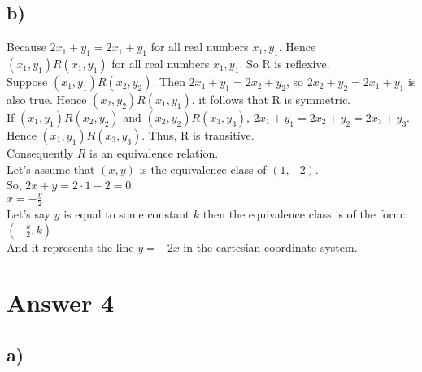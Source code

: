 \documentclass[12pt]{article}
\begin{document}
\subsection*{b) }
Because $2x_1 + y_1 = 2x_1 + y_1 $ for all real numbers $x_1,y_1$. Hence $(x_1,y_1)R(x_1,y_1)$  for all real numbers $x_1,y_1$. So R is reflexive.\\
Suppose $(x_1,y_1)R(x_2,y_2)$. Then $2x_1 + y_1 = 2x_2 + y_2 $, so $2x_2 + y_2 = 2x_1 + y_1 $ is also true. Hence $(x_2,y_2)R(x_1,y_1)$, it follows that R is symmetric.\\
If $(x_1,y_1)R(x_2,y_2)$ and $(x_2,y_2)R(x_3,y_3)$, $2x_1 + y_1 = 2x_2 + y_2 = 2x_3 + y_3$. Hence $(x_1,y_1)R(x_3,y_3)$. Thus, R is transitive.\\
Consequently $R$ is an equivalence relation.\\
Let's assume that $(x,y)$ is the equivalence class of $(1,-2)$.\\
So, $2x+y = 2\cdot1 - 2 = 0$.\\
$x= -\frac{y}{2}$\\
Let's say $y$ is equal to some constant $k$ then the equivalence class is of the form: $(-\frac{k}{2}, k)$\\
And it represents the line $y = -2x $ in the cartesian coordinate system.\\

\section*{Answer 4}
\subsection*{a) }
\end{document}
